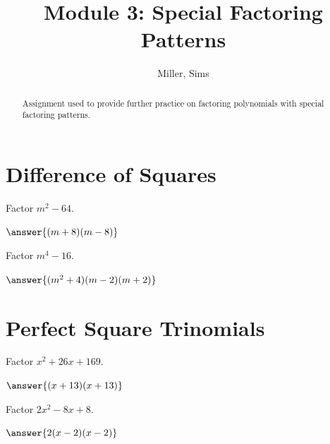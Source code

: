 \documentclass[handout]{ximera}
\title{Module 3: Special Factoring Patterns}
\author{Miller, Sims}
\begin{document}
\begin{abstract}
    Assignment used to provide further practice on factoring polynomials with special factoring patterns.
\end{abstract}

\section{Difference of Squares}

\begin{problem}
    Factor $m^2-64$.

    $\answer{(m+8)(m-8)}$
\end{problem}

\begin{problem}
    Factor $m^4-16$.

    $\answer{(m^2+4)(m-2)(m+2)}$
\end{problem}

\section{Perfect Square Trinomials}

\begin{problem}
    Factor $x^2+26x+169$.

    $\answer{(x+13)(x+13)}$
\end{problem}

\begin{problem}
    Factor $2x^2-8x+8$.

    $\answer{2(x-2)(x-2) }$
\end{problem}  
\end{document}
